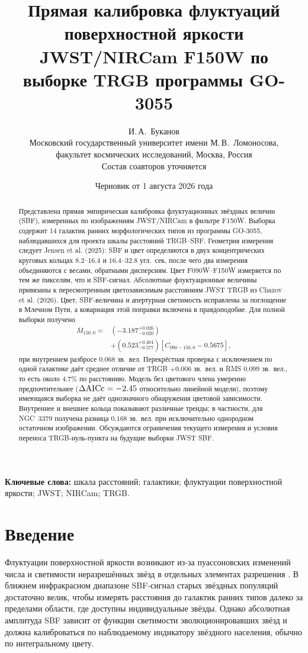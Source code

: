 \documentclass[10pt,a4paper,twocolumn]{article}
\title{Прямая калибровка флуктуаций поверхностной яркости
JWST/NIRCam F150W по выборке TRGB программы GO-3055}
\author{И.\,А.~Буканов\\[-1mm]
\small Московский государственный университет имени М.\,В.~Ломоносова,\\[-1mm]
\small факультет космических исследований, Москва, Россия\\[1mm]
\small Состав соавторов уточняется}
\date{Черновик от 1 августа 2026 года}
\newcommand{\Mbar}{\overline{M}}
\begin{document}
\maketitle

\begin{abstract}
Представлена прямая эмпирическая калибровка флуктуационных звёздных величин
(SBF), измеренных по изображениям JWST/NIRCam в фильтре F150W. Выборка
содержит 14 галактик ранних морфологических типов из программы GO-3055,
наблюдавшихся для проекта шкалы расстояний TRGB--SBF. Геометрия измерения
следует Jensen et al. (2025): SBF и цвет определяются в двух концентрических
круговых кольцах $8.2$--$16.4$ и $16.4$--$32.8$ угл.\ сек, после чего два
измерения объединяются с весами, обратными дисперсиям. Цвет F090W--F150W
измеряется по тем же пикселям, что и SBF-сигнал. Абсолютные флуктуационные
величины привязаны к пересмотренным цветозависимым расстояниям JWST TRGB из
Chazov et al. (2026). Цвет, SBF-величина и апертурная светимость исправлены
за поглощение в Млечном Пути, а ковариация этой поправки включена в
правдоподобие. Для полной выборки получено
\[
\begin{aligned}
 \Mbar_{150,0}={}&(-3.187^{+0.026}_{-0.020})\\
 &+(0.523^{+0.484}_{-0.577})
 [C_{090-150,0}-0.5675],
\end{aligned}
\]
при внутреннем разбросе $0.068$ зв.\ вел. Перекрёстная проверка с исключением
по одной галактике даёт среднее отличие от TRGB $+0.006$ зв.\ вел. и
RMS $0.099$ зв.\ вел., то есть около $4.7\%$ по расстоянию. Модель без
цветового члена умеренно предпочтительнее
($\Delta{\rm AICc}=-2.45$ относительно линейной модели), поэтому имеющаяся
выборка не даёт однозначного обнаружения цветовой зависимости. Внутреннее и
внешнее кольца показывают различные тренды; в частности, для NGC~3379
получена разница $0.168$ зв.\ вел. при исключительно однородном остаточном
изображении. Обсуждаются ограничения текущего измерения и условия переноса
TRGB-нуль-пункта на будущие выборки JWST SBF.
\end{abstract}

\noindent\textbf{Ключевые слова:} шкала расстояний; галактики; флуктуации
поверхностной яркости; JWST; NIRCam; TRGB.

\section{Введение}

Флуктуации поверхностной яркости возникают из-за пуассоновских изменений
числа и светимости неразрешённых звёзд в отдельных элементах разрешения
\citep{TonrySchneider1988}. В ближнем инфракрасном диапазоне SBF-сигнал старых
звёздных популяций достаточно велик, чтобы измерять расстояния до галактик
ранних типов далеко за пределами области, где доступны индивидуальные
звёзды. Однако абсолютная амплитуда SBF зависит от функции светимости
эволюционировавших звёзд и должна калиброваться по наблюдаемому индикатору
звёздного населения, обычно по интегральному цвету.
\end{document}
